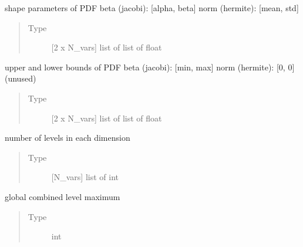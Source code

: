 \documentclass[letterpaper,10pt,english,openany,oneside]{sphinxmanual}
\begin{document}
\begin{fulllineitems}
\begin{fulllineitems}
\label{\detokenize{pygpc:pygpc.grid.SparseGrid.grid_shape}}
shape parameters of PDF
beta (jacobi):  {[}alpha, beta{]}
norm (hermite): {[}mean, std{]}
\begin{quote}\begin{description}
\item[{Type}] \leavevmode
{[}2 x N\_vars{]} list of list of float

\end{description}\end{quote}

\end{fulllineitems}


\begin{fulllineitems}
\label{\detokenize{pygpc:pygpc.grid.SparseGrid.limits}}
upper and lower bounds of PDF
beta (jacobi):  {[}min, max{]}
norm (hermite): {[}0, 0{]} (unused)
\begin{quote}\begin{description}
\item[{Type}] \leavevmode
{[}2 x N\_vars{]} list of list of float

\end{description}\end{quote}

\end{fulllineitems}


\begin{fulllineitems}
\label{\detokenize{pygpc:pygpc.grid.SparseGrid.level}}
number of levels in each dimension
\begin{quote}\begin{description}
\item[{Type}] \leavevmode
{[}N\_vars{]} list of int

\end{description}\end{quote}

\end{fulllineitems}


\begin{fulllineitems}
\label{\detokenize{pygpc:pygpc.grid.SparseGrid.level_max}}
global combined level maximum
\begin{quote}\begin{description}
\item[{Type}] \leavevmode
int


\end{description}
\end{quote}
\end{fulllineitems}
\end{fulllineitems}
\end{document}

